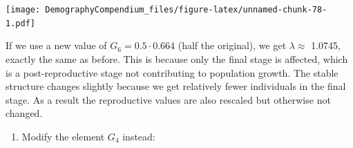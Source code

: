 \documentclass[
]{book}
\providecommand{\tightlist}{%
  \setlength{\itemsep}{0pt}\setlength{\parskip}{0pt}}
\begin{document}
\texttt{[image: DemographyCompendium\_files/figure-latex/unnamed-chunk-78-1.pdf]}

If we use a new value of \(G_6=0.5\cdot 0.664\) (half the original), we get \(\lambda\approx\) 1.0745, exactly the same as before. This is because only the final stage is affected, which is a post-reproductive stage not contributing to population growth. The stable structure changes slightly because we get relatively fewer individuals in the final stage. As a result the reproductive values are also rescaled but otherwise not changed.

\begin{enumerate}
\def\labelenumi{\arabic{enumi}.}
\setcounter{enumi}{4}
\tightlist
\item
  Modify the element \(G_4\) instead:
\end{enumerate}
\end{document}

